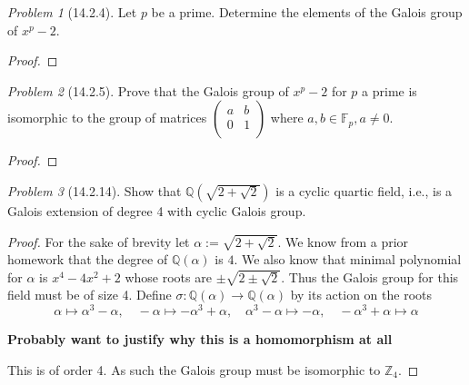 \documentclass[10pt]{article}
\newcommand{\sk}{\vskip 10mm}
\newcommand{\bb}[1]{\mathbb{#1}}
\theoremstyle{remark}
\newtheorem{problem}{Problem}
\theoremstyle{remark}
\begin{document}
\sk

\begin{problem}[14.2.4]
  Let $p$ be a prime. Determine the elements of the Galois group of $x^p-2$.
\end{problem}

\begin{proof}
  
\end{proof}

\sk

\begin{problem}[14.2.5]
  Prove that the Galois group of $x^p-2$ for $p$ a prime is isomorphic to
  the group of matrices $\left(\begin{array}{cc}a&b\\0&1\\ \end{array}\right)$
  where $a,b\in\bb{F}_p,a\neq 0$.
\end{problem}

\begin{proof}
  
\end{proof}

\sk

\begin{problem}[14.2.14]
  Show that $\bb{Q}(\sqrt{2+\sqrt{2}})$ is a cyclic quartic field,
  i.e., is a Galois extension of degree 4 with cyclic Galois group.
\end{problem}

\begin{proof}
  For the sake of brevity let $\alpha:=\sqrt{2+\sqrt{2}}$.
  We know from a prior homework that the degree of $\bb{Q}(\alpha)$
  is $4$. We also know that minimal polynomial for $\alpha$ is
  $x^4-4x^2+2$ whose roots are $\pm\sqrt{2\pm\sqrt{2}}$. Thus the Galois group
  for this field must be of size 4. Define $\sigma:\bb{Q}(\alpha)\rightarrow\bb{Q}(\alpha)$ by
  its action on the roots
  \[\alpha\mapsto\alpha^3-\alpha,\quad-\alpha\mapsto-\alpha^3+\alpha,\quad\alpha^3-\alpha\mapsto-\alpha,\quad-\alpha^3+\alpha\mapsto\alpha \]

  \textbf{Probably want to justify why this is a homomorphism at all}
  
  This is of order 4. As such the Galois group must be isomorphic to
  $\bb{Z}_4$.
\end{proof}

\sk

\end{document}
